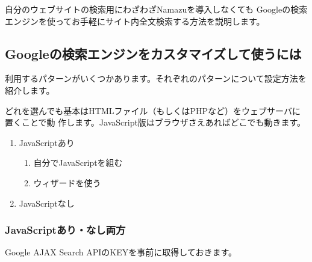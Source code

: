 \documentclass[mingoth,a4paper]{jsarticle}
\begin{document}
自分のウェブサイトの検索用にわざわざNamazuを導入しなくても
Googleの検索エンジンを使ってお手軽にサイト内全文検索する方法を説明します。

\subsection{Googleの検索エンジンをカスタマイズして使うには}

利用するパターンがいくつかあります。それぞれのパターンについて設定方法を
紹介します。

どれを選んでも基本はHTMLファイル（もしくはPHPなど）をウェブサーバに置くことで動
作します。JavaScript版はブラウザさえあればどこでも動きます。

\begin{enumerate}
\item JavaScriptあり
\begin{enumerate}
\item 自分でJavaScriptを組む
\item ウィザードを使う
\end{enumerate}
\item JavaScriptなし
\end{enumerate}


\subsubsection{JavaScriptあり・なし両方}
Google AJAX Search APIのKEYを事前に取得しておきます。
\end{document}
